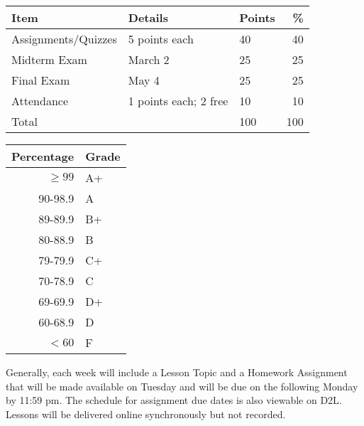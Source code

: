 \documentclass{tufte-handout}
\begin{document}
\begin{table}
\begin{tabular}{l l l r}
Item & Details & Points &  \% \\
\hline
Assignments/Quizzes  &  5 points each & 40 & 40\\
Midterm Exam & March 2 & 25 & 25 \\
Final Exam & May 4 & 25 & 25 \\
Attendance & 1 points each; 2 free & 10 & 10 \\
\hline
Total & & 100 & 100 
\end{tabular}
\end{table}
\begin{margintable}
\begin{tabular}{rl}
Percentage & Grade \\
\hline 
$\ge99$ & A+ \\
90-98.9 & A \\
89-89.9 & B+ \\
80-88.9 & B \\
79-79.9 & C+ \\
70-78.9 & C \\
69-69.9 & D+ \\
60-68.9 & D \\
$<60$ & F \\
\hline
\end{tabular}
\end{margintable}





Generally, each week will include a Lesson Topic and a Homework Assignment that will be made available on Tuesday and will be due on the following Monday by 11:59 pm. The schedule for assignment due dates is also viewable on D2L. Lessons will be delivered online synchronously but not recorded. 
\end{document}
